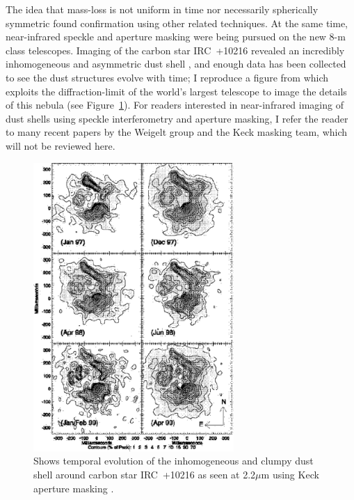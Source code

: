 \documentclass[12pt]{article}
\begin{document}
The idea that mass-loss is not uniform in time nor necessarily
spherically symmetric found confirmation using other related
techniques.  At the same time, near-infrared speckle and aperture
masking were being pursued on the new 8-m class telescopes.  Imaging
of the carbon star IRC~+10216 revealed an incredibly inhomogeneous and
asymmetric dust shell \citep{haniff1998,weigelt1998,tuthill2000}, and
enough data has been collected to see the dust structures evolve with
time; I reproduce  a figure from \citet{tuthill2000} which
exploits the diffraction-limit of the world's largest telescope to
image the details of this nebula (see Figure~\ref{irc10216}).  For
readers interested in near-infrared imaging of dust shells using
speckle interferometry and aperture masking, I refer the reader to
many recent papers by the Weigelt group and the Keck masking team,
which will not be reviewed here.

\begin{figure}[tbhp]
\begin{center}
  \includegraphics[clip,angle=0,width=3.0in]{Figures/JDM_tuthill2000.eps}
\caption{\footnotesize Shows temporal evolution of the
  inhomogeneous and clumpy dust shell around carbon star IRC~+10216 as
  seen at 2.2$\mu$m using Keck aperture masking \citep[Figure 1
  from][reproduced with permission of the AAS]{tuthill2000a}.
\label{irc10216}}
\end{center}
\end{figure}
\end{document}
